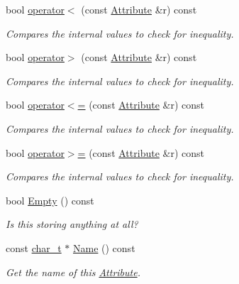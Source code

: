 \begin{DoxyCompactItemize}
bool \hyperlink{classphys_1_1xml_1_1Attribute_ac383f0c514e550fe992b1c0a0f3cbd7a}{operator$<$} (const \hyperlink{classphys_1_1xml_1_1Attribute}{Attribute} \&r) const 
\begin{DoxyCompactList}\small\item\em Compares the internal values to check for inequality. \item\end{DoxyCompactList}\item 
bool \hyperlink{classphys_1_1xml_1_1Attribute_ac778ad4d7aa3a179217de1425e220848}{operator$>$} (const \hyperlink{classphys_1_1xml_1_1Attribute}{Attribute} \&r) const 
\begin{DoxyCompactList}\small\item\em Compares the internal values to check for inequality. \item\end{DoxyCompactList}\item 
bool \hyperlink{classphys_1_1xml_1_1Attribute_a3b73bd409a2b6b9a7d72c3affc96bae1}{operator$<$=} (const \hyperlink{classphys_1_1xml_1_1Attribute}{Attribute} \&r) const 
\begin{DoxyCompactList}\small\item\em Compares the internal values to check for inequality. \item\end{DoxyCompactList}\item 
bool \hyperlink{classphys_1_1xml_1_1Attribute_ab1d63c57891107848492dc3316c95455}{operator$>$=} (const \hyperlink{classphys_1_1xml_1_1Attribute}{Attribute} \&r) const 
\begin{DoxyCompactList}\small\item\em Compares the internal values to check for inequality. \item\end{DoxyCompactList}\item 
bool \hyperlink{classphys_1_1xml_1_1Attribute_a6d0157a562f283e9c87d1cc46b3405cc}{Empty} () const 
\begin{DoxyCompactList}\small\item\em Is this storing anything at all? \item\end{DoxyCompactList}\item 
const \hyperlink{namespacephys_1_1xml_afc87705cd1c2917d87b879715a2d8f6e}{char\_\-t} $\ast$ \hyperlink{classphys_1_1xml_1_1Attribute_ab4c1186366d975d2086bf81df2ce1135}{Name} () const 
\begin{DoxyCompactList}\small\item\em Get the name of this \hyperlink{classphys_1_1xml_1_1Attribute}{Attribute}. \item\end{DoxyCompactList}\item 

\end{DoxyCompactItemize}
